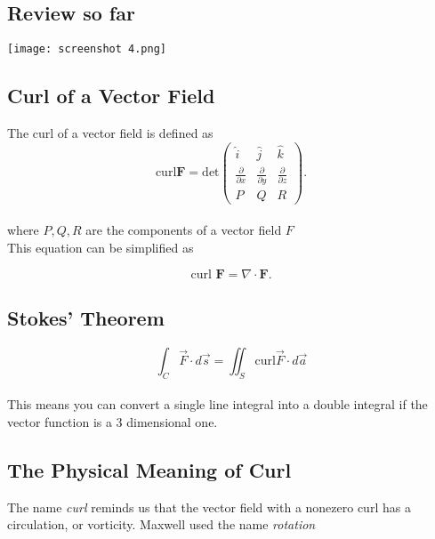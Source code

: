 \documentclass[svgnames]{article}
\begin{document}
\subsection{Review so far} 
\vspace{20px}
\begin{center}
  \texttt{[image: screenshot 4.png]}
\end{center}

\vspace{20px}

\subsection{Curl of a Vector Field}

The curl of a vector field is defined as \[
  \text{curl} \textbf{F} = \text{det} \begin{pmatrix}
    \hat{i} & \hat{j} & \hat{k} \\
    \frac{\partial}{\partial x} & \frac{\partial}{\partial y}
                                & \frac{\partial}{\partial z} \\
    P & Q & R 
  \end{pmatrix}
.\] \\
where $P, Q, R$ are the components of a vector field $F$ \\

This equation can be simplified as 

\[
  \text{curl } \textbf{F} = \nabla \cdot \textbf{F}   
.\] 


\subsection{Stokes' Theorem}

\[ \int_C \vec{F} \cdot d\vec{s} = \iint_S \text{curl} \vec{F} \cdot d\vec{a}
\] \\

This means you can convert a single line integral into a double integral if the
vector function is a 3 dimensional one. 

\subsection{The Physical Meaning of Curl}


The name \textit{curl} reminds us that the vector field with a nonezero curl
has a circulation, or vorticity. Maxwell used the name \textit{rotation}\\
\end{document}
